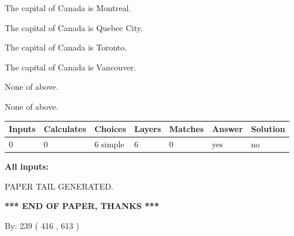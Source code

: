 \documentclass[12pt]{article}
\begin{document}
 
The capital of Canada is Montreal.
 
 
The capital of Canada is Quebec City.
 
 
The capital of Canada is Toronto.
 
 
The capital of Canada is Vancouver.
 
 
 None of above.
 
 
\noindent{}
 
 
 None of above.
 
 
\noindent{}
 
 
   
   
   
   
\noindent\begin{tabular}{|l|l|l|l|l|l|l|}
 \hline
Inputs & Calculates & Choices & Layers & Matches & Answer & Solution \\ \hline
 0  & 
 0  & 
 6
  simple  
  & 
 6  & 
 0  & 
  yes & 
  no 
  \\ \hline
 \end{tabular}
   
   
   
   
\noindent{}
   
   
   
   
\noindent\vspace{0.1in}\hspace{-0.08in} {\textbf{\Large{All inputs: }}}
   
   
   
   
   
   
 \vspace{0.2in}
 
   
   
\vspace{2.0in} PAPER TAIL GENERATED.
   
   
   
   
\vspace{1.0in} 
{\textbf{\large{ *** END OF PAPER, THANKS *** }}} 
   
   
\hspace{1.0in} By: 
 239 ( 416 ,  613 )
   
\end{document}
